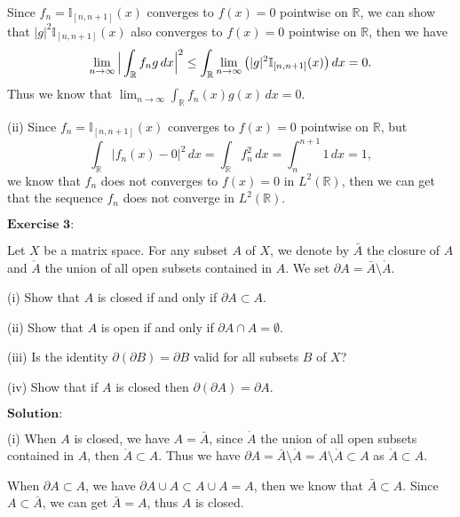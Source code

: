 \documentclass[12pt,a4paper]{ctexart}
\begin{document}
Since $f_{n} = \mathbb{I}_{[n, n+1]} (x)$ converges to $f(x) = 0$ pointwise on $\mathbb{R}$, we can show that $|g|^{2} \mathbb{I}_{[n, n+1]} (x)$ also converges to $f(x) = 0$ pointwise on $\mathbb{R}$, then we have
\begin{equation*}
    \lim_{n \to \infty} \Big{|} \int_{\mathbb{R}}^{} f_{n} g \, d x \Big{|}^{2} \leq \int_{\mathbb{R}}^{} \lim_{n \to \infty} \big{(} |g|^{2} \mathbb{I}_{[n, n+1]} (x)  \big{)} \, d x = 0.
\end{equation*}
Thus we know that $\lim_{n \to \infty} \int_{\mathbb{R}}^{} f_{n}(x) g(x) \, d x = 0$.

(ii) Since $f_{n} = \mathbb{I}_{[n, n+1]} (x)$ converges to $f(x) = 0$ pointwise on $\mathbb{R}$, but 
\begin{equation*}
    \int_{\mathbb{R}}^{} |f_{n}(x) - 0|^{2} \, d x = \int_{\mathbb{R}}^{} f_{n}^{2} \, d x = \int_{n}^{n + 1} 1 \, d x = 1,
\end{equation*}
we know that $f_{n}$ does not converges to $f(x) = 0$ in $L^{2}(\mathbb{R})$, then we can get that the sequence $f_{n}$ does not converge in $L^{2}(\mathbb{R})$.

\vspace{8pt}

$\textbf{Exercise 3:}$

Let $X$ be a matrix space. For any subset $A$ of $X$, we denote by $\bar{A}$ the closure of $A$ and $\mathring{A}$ the union of all open subsets contained in $A$. We set $\partial A = \bar{A} \setminus \mathring{A} $.

(i) Show that $A$ is closed if and only if $\partial A \subset A$.

(ii) Show that $A$ is open if and only if $\partial A \cap A = \emptyset$.

(iii) Is the identity $\partial (\partial B) = \partial B$ valid for all subsets $B$ of $X$?
  
(iv) Show that if $A$ is closed then $\partial(\partial A) = \partial A$.

\vspace{8pt}
$\textbf{Solution:}$

(i) When $A$ is closed, we have $A = \bar{A}$, since $\mathring{A}$ the union of all open subsets contained in $A$, then $\mathring{A} \subset A$. Thus we have $\partial A = \bar{A} \setminus \mathring{A} = A \setminus \mathring{A}  \subset A$ as $\mathring{A} \subset A$.

When $\partial A \subset A$, we have $\partial A \cup A \subset A \cup A = A$, then we know that $\bar{A} \subset A$. Since $A \subset \bar{A}$, we can get $\bar{A} = A$, thus $A$ is closed.
\end{document}
